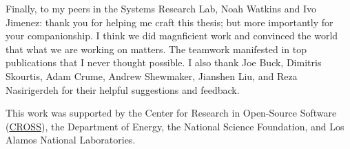 \begin{frontmatter}
\begin{acknowledgements}
Finally, to my peers in the Systems Research Lab, Noah Watkins and Ivo Jimenez:
thank you for helping me craft this thesis; but more importantly for your
companionship. I think we did magnficient work and convinced the world that
what we are working on matters.  The teamwork manifested in top publications
that I never thought possible. I also thank Joe Buck, Dimitris Skourtis, Adam
Crume, Andrew Shewmaker, Jianshen Liu, and Reza Nasirigerdeh for their helpful
suggestions and feedback.

This work was supported by the Center for Research in Open-Source Software
(\href{www.cross.soe.ucsc.edu}{CROSS}), the Department of Energy, the National
Science Foundation, and Los Alamos National Laboratories.

	\end{acknowledgements}
\end{frontmatter}
